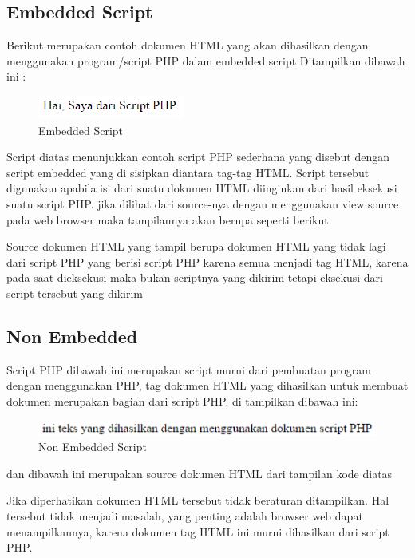 \subsection{Embedded Script}
  \item Berikut merupakan contoh dokumen HTML yang akan dihasilkan dengan menggunakan program/script PHP dalam embedded script
    Ditampilkan dibawah ini  :
    
\begin{figure}[h]
\centering
\includegraphics[scale=1]{figures/embedded}
\caption{Embedded Script}
\label{embedded}
\end{figure}
Script diatas menunjukkan contoh script PHP sederhana yang disebut dengan script embedded yang di sisipkan diantara tag-tag HTML. Script tersebut digunakan apabila isi dari suatu dokumen HTML diinginkan dari hasil eksekusi suatu script PHP. jika dilihat dari source-nya dengan menggunakan view source pada web browser maka tampilannya akan berupa seperti berikut
    
Source dokumen HTML yang tampil berupa dokumen HTML yang tidak lagi dari script PHP yang berisi script PHP karena semua menjadi tag HTML, karena pada saat dieksekusi maka bukan scriptnya yang dikirim tetapi eksekusi dari script tersebut yang dikirim 
\subsection{Non Embedded}
   \item Script PHP dibawah ini merupakan script murni dari pembuatan program dengan menggunakan PHP, tag dokumen HTML yang dihasilkan untuk membuat dokumen merupakan bagian dari script PHP. di tampilkan dibawah ini:
  
\begin{figure}[h]
\centering
\includegraphics[scale=1]{figures/non-embedded}
\caption{Non Embedded Script}
\label{nonembedded}
\end{figure}
dan dibawah ini merupakan source dokumen HTML dari tampilan kode diatas  
  
Jika diperhatikan dokumen HTML tersebut tidak beraturan ditampilkan. Hal tersebut tidak menjadi masalah, yang penting adalah browser web dapat menampilkannya, karena dokumen tag HTML ini murni dihasilkan dari script PHP. 

